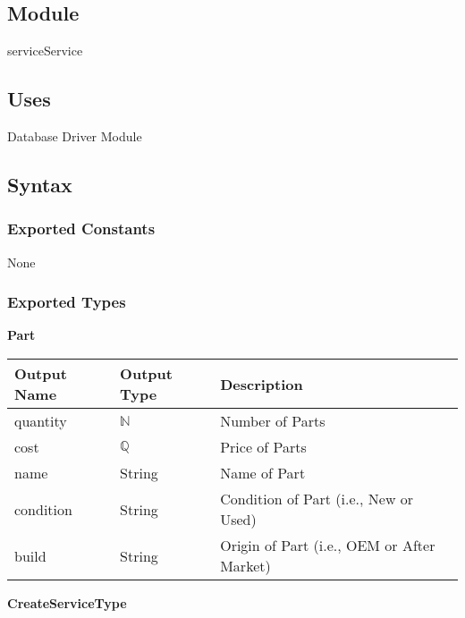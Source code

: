 \documentclass[12pt, titlepage]{article}
\begin{document}
\subsection{Module}

serviceService

\subsection{Uses}

Database Driver Module

\subsection{Syntax}

\subsubsection{Exported Constants}

None

\subsubsection{Exported Types}

\textbf{Part}

\begin{table}[H]
	\begin{tabular}{|l|l|l|}
		\hline
		\textbf{Output Name} & \textbf{Output Type} & \textbf{Description}                       \\
		\hline
		quantity             & $\mathbb{N}$         & Number of Parts                            \\
		\hline
		cost                 & $\mathbb{Q}$         & Price of Parts                             \\
		\hline
		name                 & String               & Name of Part                               \\
		\hline
		condition            & String               & Condition of Part  (i.e., New or Used)     \\
		\hline
		build                & String               & Origin of Part (i.e., OEM or After Market) \\
		\hline
	\end{tabular}
\end{table}

\textbf{CreateServiceType}
\end{document}
